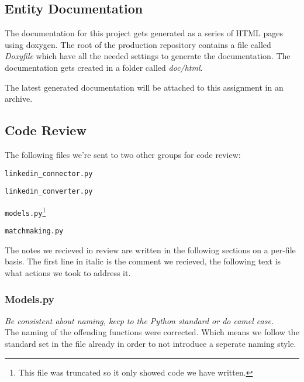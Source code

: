 \subsection{Entity Documentation}

The documentation for this project gets generated as a series of HTML pages
using doxygen. The root of the production repository contains a file called
\textit{Doxyfile} which have all the needed settings to generate the
documentation. The documentation gets created in a folder called
\textit{doc/html}.

The latest generated documentation will be attached to this assignment in an
archive.

\subsection{Code Review}
The following files we're sent to two other groups for code review:
\begin{itemize*}
    \item \texttt{linkedin\_connector.py}
    \item \texttt{linkedin\_converter.py}
    \item \texttt{models.py}\footnote{This file was truncated so it only showed code we have written.}
    \item \texttt{matchmaking.py}
\end{itemize*}

The notes we recieved in review are written in the following sections on a per-file basis.
The first line in italic is the comment we recieved, the following text is what actions we took to address it.

\subsubsection{Models.py}
\begin{itemize*}
    \item \textit{Be consistent about naming, keep to the Python standard or do camel case.}\\
          The naming of the offending functions were corrected. Which means we follow the standard set in the file already in order to not introduce a seperate naming style.
\end{itemize*}


